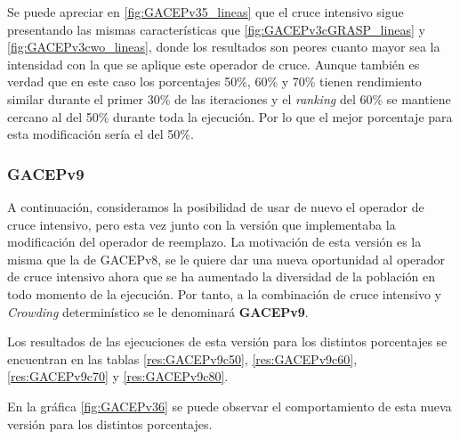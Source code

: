 Se puede apreciar en \ref{fig:GACEPv35_lineas} que el cruce intensivo sigue presentando las mismas características que \ref{fig:GACEPv3cGRASP_lineas} y \ref{fig:GACEPv3cwo_lineas}, donde los resultados son peores cuanto mayor sea la intensidad con la que se aplique este operador de cruce. 
Aunque también es verdad que en este caso los porcentajes 50\%, 60\% y 70\% tienen rendimiento similar durante el primer 30\% de las iteraciones y el \textit{ranking} del 60\% se mantiene cercano al del 50\% durante toda la ejecución. 
Por lo que el mejor porcentaje para esta modificación sería el del 50\%.

\subsubsection{GACEPv9}

A continuación, consideramos la posibilidad de usar de nuevo el operador de cruce intensivo, pero esta vez junto con la versión que implementaba la modificación del operador de reemplazo. 
La motivación de esta versión es la misma que la de GACEPv8, se le quiere dar una nueva oportunidad al operador de cruce intensivo ahora que se ha aumentado la diversidad de la población en todo momento de la ejecución.
Por tanto, a la combinación de cruce intensivo y \textit{Crowding} determinístico se le denominará \textbf{GACEPv9}.
 
Los resultados de las ejecuciones de esta versión para los distintos porcentajes se encuentran en las tablas \ref{res:GACEPv9c50}, \ref{res:GACEPv9c60}, \ref{res:GACEPv9c70} y \ref{res:GACEPv9c80}.

En la gráfica \ref{fig:GACEPv36} se puede observar el comportamiento de esta nueva versión para los distintos porcentajes. 

